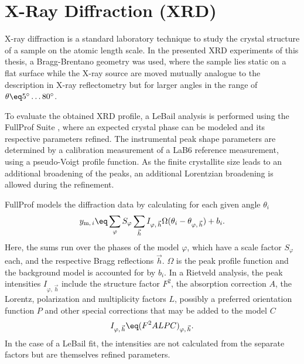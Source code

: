 \documentclass[\main/dresen_thesis.tex]{subfiles}
\begin{document}
  \section{X-Ray Diffraction (XRD)}
    \label{ch:methods:xrd}
    X-ray diffraction is a standard laboratory technique to study the crystal structure of a sample on the atomic length scale.
    In the presented XRD experiments of this thesis, a Bragg-Brentano geometry was used, where the sample lies static on a flat surface while the X-ray source are moved mutually analogue to the description in X-ray reflectometry but for larger angles in the range of $\theta \eq 5^\circ \ldots 80^\circ$.

    To evaluate the obtained XRD profile, a LeBail analysis is performed using the FullProf Suite \cite{Rodriguez_1993_Recen}, where an expected crystal phase can be modeled and its respective parameters refined.
    The instrumental peak shape parameters are determined by a calibration measurement of a LaB6 reference measurement, using a pseudo-Voigt profile function.
    As the finite crystallite size leads to an additional broadening of the peaks, an additional Lorentzian broadening is allowed during the refinement.

    FullProf models the diffraction data by calculating for each given angle $\theta_i$
    \begin{align}
      y_{\mathrm{m}, \, i} \eq
        \sum_{\varphi} S_{\varphi}
        \sum_{\vec{h}}
          I_{\varphi, \, \vec{h}}
          \Omega ( \theta_{i} - \theta_{\varphi, \, \vec{h}})
        + b_i.
    \end{align}
    Here, the sums run over the phases of the model $\varphi$, which have a scale factor $S_{\varphi}$ each, and the respective Bragg reflections $\vec{h}$.
    $\Omega$ is the peak profile function and the background model is accounted for by $b_i$.
    In a Rietveld analysis, the peak intensities $I_{\varphi, \, \vec{h}}$ include the structure factor $F^2$, the absorption correction $A$, the Lorentz, polarization and multiplicity factors $L$, possibly a preferred orientation function $P$ and other special corrections that may be added to the model $C$
    \begin{align}
      I_{\varphi, \, \vec{h}} \eq (F^2 A L P C)_{\varphi, \, \vec{h}}.
    \end{align}
    In the case of a LeBail fit, the intensities are not calculated from the separate factors but are themselves refined parameters.
\end{document}
